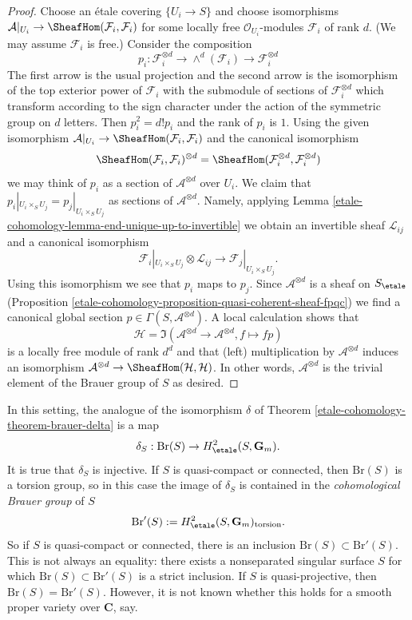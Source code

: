 \begin{proof}
Choose an \'etale covering $\{U_i \to S\}$ and choose isomorphisms
$\mathcal{A}|_{U_i} \to \SheafHom(\mathcal{F}_i, \mathcal{F}_i)$
for some locally free $\mathcal{O}_{U_i}$-modules $\mathcal{F}_i$
of rank $d$. (We may assume $\mathcal{F}_i$ is free.) Consider the
composition
$$
p_i : \mathcal{F}_i^{\otimes d} \to
\wedge^d(\mathcal{F}_i) \to \mathcal{F}_i^{\otimes d}
$$
The first arrow is the usual projection and the second arrow is
the isomorphism of the top exterior power of $\mathcal{F}_i$ with
the submodule of sections of $\mathcal{F}_i^{\otimes d}$ which transform
according to the sign character under the action of the symmetric group
on $d$ letters. Then $p_i^2 = d! p_i$ and the rank of $p_i$ is $1$.
Using the given isomorphism
$\mathcal{A}|_{U_i} \to \SheafHom(\mathcal{F}_i, \mathcal{F}_i)$
and the canonical isomorphism
$$
\SheafHom(\mathcal{F}_i, \mathcal{F}_i)^{\otimes d} =
\SheafHom(\mathcal{F}_i^{\otimes d}, \mathcal{F}_i^{\otimes d})
$$
we may think of $p_i$ as a section of $\mathcal{A}^{\otimes d}$
over $U_i$. We claim that $p_i|_{U_i \times_S U_j} = p_j|_{U_i \times_S U_j}$
as sections of $\mathcal{A}^{\otimes d}$. Namely, applying
Lemma \ref{etale-cohomology-lemma-end-unique-up-to-invertible}
we obtain an invertible sheaf $\mathcal{L}_{ij}$ and a canonical isomorphism
$$
\mathcal{F}_i|_{U_i \times_S U_j} \otimes \mathcal{L}_{ij}
\longrightarrow
\mathcal{F}_j|_{U_i \times_S U_j}.
$$
Using this isomorphism we see that $p_i$ maps to $p_j$.
Since $\mathcal{A}^{\otimes d}$ is a sheaf on $S_\etale$
(Proposition \ref{etale-cohomology-proposition-quasi-coherent-sheaf-fpqc}) we find a canonical
global section $p \in \Gamma(S, \mathcal{A}^{\otimes d})$. A local calculation
shows that
$$
\mathcal{H} =
\Im(\mathcal{A}^{\otimes d} \to \mathcal{A}^{\otimes d}, f \mapsto fp)
$$
is a locally free module of rank $d^d$ and that (left) multiplication
by $\mathcal{A}^{\otimes d}$ induces an isomorphism
$\mathcal{A}^{\otimes d} \to \SheafHom(\mathcal{H}, \mathcal{H})$.
In other words, $\mathcal{A}^{\otimes d}$ is the trivial element
of the Brauer group of $S$ as desired.
\end{proof}

In this setting, the analogue of the isomorphism $\delta$ of
Theorem \ref{etale-cohomology-theorem-brauer-delta}
is a map
$$
\delta_S: \text{Br}(S) \to H_\etale^2(S, \mathbf{G}_m).
$$
It is true that $\delta_S$ is injective. If $S$ is quasi-compact or
connected, then $\text{Br}(S)$ is a torsion group, so in this case the
image of $\delta_S$ is contained in the {\it cohomological Brauer group} of $S$
$$
\text{Br}'(S) := H_\etale^2(S, \mathbf{G}_m)_\text{torsion}.
$$
So if $S$ is quasi-compact or connected, there is an inclusion $\text{Br}(S)
\subset \text{Br}'(S)$. This is not always an equality: there exists a
nonseparated singular surface $S$ for which $\text{Br}(S) \subset
\text{Br}'(S)$ is a strict inclusion. If $S$ is quasi-projective, then
$\text{Br}(S) = \text{Br}'(S)$. However, it is not known whether this holds for
a smooth proper variety over $\mathbf{C}$, say.

